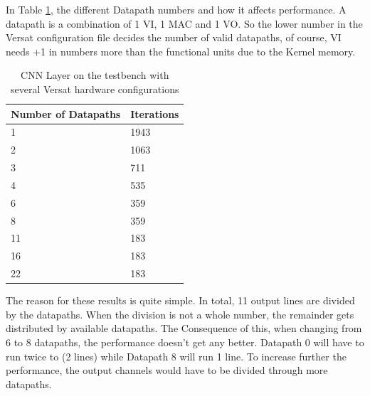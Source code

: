 In Table \ref{table:Iterations}, the different Datapath numbers and how it affects performance.
A datapath is a combination of 1 VI, 1 MAC and 1 VO. So the lower number in the Versat configuration file
decides the number of valid datapaths, of course, VI needs +1 in numbers more than the functional units due to the Kernel memory.
\newpage
\begin{table}[!htpb]
    \centering
    \begin{tabular}{ll}
    \hline
    \textbf{Number of Datapaths} &  \textbf{Iterations}        \\ \hline
    1          & 1943                 \\
	2          & 1063                 \\
	3          & 711                 \\
	4          & 535                 \\
	6          & 359                 \\
	8          & 359                 \\
	11          & 183                 \\
	16          & 183                 \\
    22            & 183                       \\  \hline
    \end{tabular}
    \label{table:Iterations}
    \caption{CNN Layer on the testbench with several Versat hardware configurations}
\end{table}

The reason for these results is quite simple. In total, 11 output lines are divided
by the datapaths. When the division is not a whole number, the remainder gets distributed
by available datapaths. The Consequence of this, when changing from 6 to 8 datapaths, the performance
doesn't get any better. Datapath 0 will have to run twice to (2 lines) while Datapath 8 will run 1 line.
To increase further the performance, the output channels would have to be divided through more datapaths.